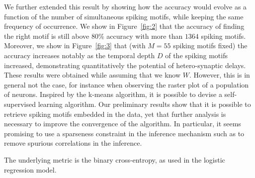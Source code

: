 \documentclass[11pt]{article}
\begin{document}
We further extended this result by showing how the accuracy would evolve as a function of the number of simultaneous spiking motifs, while keeping the same frequency of occurrence. We show in Figure~\ref{fig:2} that the accuracy of finding the right motif is still above $80\%$ accuracy with more than $1364$ spiking motifs. Moreover, we show in Figure~\ref{fig:3} that (with $M=55$ spiking motifs fixed) the accuracy increases notably as the temporal depth $D$ of the spiking motifs increased, demonstrating quantitatively the potential of hetero-synaptic delays. These results were obtained while assuming that we know $W$. However, this is in general not the case, for instance when observing the raster plot of a population of neurons. Inspired by the k-means algorithm, it is possible to devise a self-supervised learning algorithm. Our preliminary results show that it is possible to retrieve spiking motifs embedded in the data, yet that further analysis is necessary to improve the convergence of the algorithm. In particular, it seems promising to use a sparseness constraint in the inference mechanism such as to remove spurious correlations in the inference.

The underlying metric is the binary cross-entropy, as used in the logistic regression model.

%
\printbibliography
\end{document}
